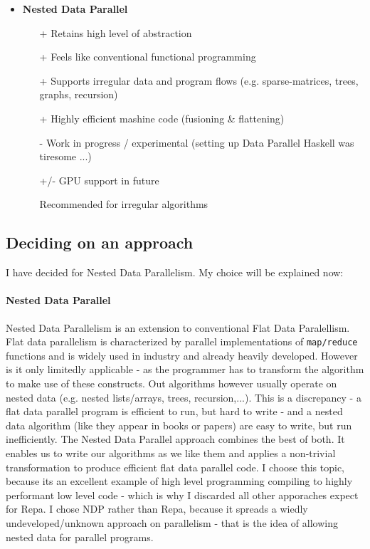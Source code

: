 \documentclass{article}
\newcommand{\note}[1]{{\tiny (#1)}}
\begin{document}
\begin{itemize}
    \item \textbf{Nested Data Parallel}
        \begin{itemize}
            \item[+] Retains high level of abstraction
            \item[+] Feels like conventional functional programming
            \item[+] Supports irregular data and program flows (e.g. sparse-matrices, trees, graphs, recursion)
            \item[+] Highly efficient mashine code (fusioning \& flattening)
            \item[-] Work in progress / experimental \note{setting up Data Parallel Haskell was tiresome ...}
            \item[+/-] GPU support in future
            \item[\textbullet] Recommended for irregular algorithms
        \end{itemize}
    
    \end{itemize}
    
    \subsection{Deciding on an approach}
    
    I have decided for Nested Data Parallelism. My choice will be explained now:
    \paragraph{Nested Data Parallel}
        Nested Data Parallelism is an extension to conventional Flat Data Paralellism.
        Flat data parallelism is characterized by parallel implementations of \texttt{map/reduce} functions and
        is widely used in industry and already heavily developed.
        However is it only limitedly applicable - as the programmer has to transform the algorithm to make use of these constructs.
        Out algorithms however usually operate on nested data (e.g. nested lists/arrays, trees, recursion,...).
        This is a discrepancy - a flat data parallel program is efficient to run, but hard to write
        - and a nested data algorithm (like they appear in books or papers) are easy to write, but run inefficiently.
        The Nested Data Parallel approach \cite{Chakravarty2007Data} combines the best of both.
        It enables us to write our algorithms as we like them and applies a non-trivial transformation to
        produce efficient flat data parallel code.
        I choose this topic, because its an excellent example of high level programming compiling to highly performant low level code
        - which is why I discarded all other apporaches expect for Repa.
        I chose NDP rather than Repa, because it spreads a wiedly undeveloped/unknown approach on parallelism - that is the
        idea of allowing nested data for parallel programs.
        
\end{document}
